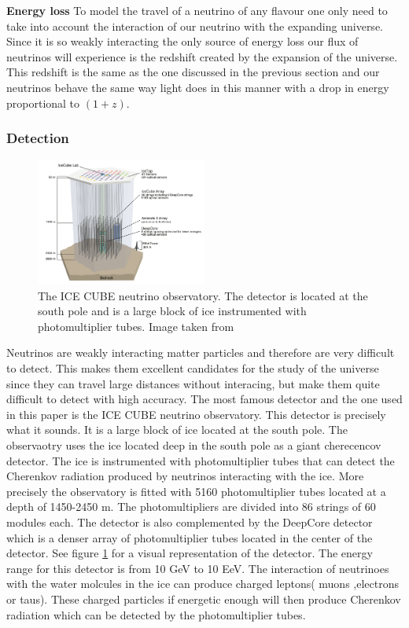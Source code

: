 \documentclass{article}
\begin{document}
\textbf{Energy loss}
To model the travel of a neutrino of any flavour one only need to take into account the interaction of our neutrino with the expanding universe. Since it is so weakly interacting the only 
source of energy loss our flux of neutrinos will experience is the redshift created by the expansion of the universe. This redshift is the same as the one discussed in the previous section and our neutrinos 
behave the same way light does in this manner with a drop in energy proportional to $(1+z)$.



 

\subsubsection{Detection}
\begin{figure}
    \centering
    \includegraphics[width = 0.5\textwidth]{Ice_cube_layot.png}
    \caption{The ICE CUBE neutrino observatory. The detector is located at the south pole and is a large block of ice instrumented with photomultiplier tubes. Image taken from \cite{Andeen_2019}}
    \label{fig:Ice_cube}
\end{figure}

Neutrinos are weakly interacting matter particles and therefore are very difficult to detect. This makes them excellent candidates for the study of the universe since they can travel large distances without interacing, but make them 
quite difficult to detect with high accuracy. The most famous detector and the one used in this paper is the ICE CUBE neutrino observatory. This detector is precisely what it sounds. It is a large block of ice located at the south pole.
The observaotry uses the ice located deep in the south pole as a giant cherecencov detector. The ice is instrumented with photomultiplier tubes that can detect the Cherenkov radiation produced by neutrinos interacting with the ice. 
More precisely the observatory is fitted with 5160 photomultiplier tubes located at a depth of 1450-2450 m. The photomultipliers are divided into 86 strings of 60 modules each. The detector is also complemented by the DeepCore detector which is a denser array of photomultiplier tubes located in the center of the detector. See figure \ref{fig:Ice_cube} for a visual representation of the detector.
The energy range for this detector is from 10 GeV to 10 EeV. The interaction of neutrinoes with the water molcules in the ice can produce charged leptons( muons ,electrons or taus). These charged particles if energetic enough will then produce Cherenkov radiation which can be detected by the photomultiplier tubes.
\end{document}
